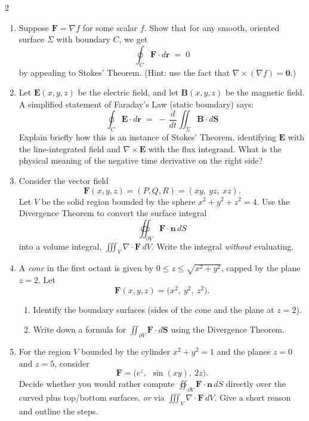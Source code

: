 \begin{multicols}{2}
\begin{enumerate}
\item \enspace
Suppose \(\mathbf{F} = \nabla f\) for some scalar \(f\). Show that for any smooth, oriented surface \(\Sigma\) with boundary \(C\), we get
\[
\oint_C \mathbf{F}\cdot d\mathbf{r} \;=\; 0
\]
by appealing to Stokes' Theorem. (Hint: use the fact that \(\nabla\times(\nabla f)=\mathbf{0}\).)

\item \enspace
Let \(\mathbf{E}(x,y,z)\) be the electric field, and let \(\mathbf{B}(x,y,z)\) be the magnetic field. A simplified statement of Faraday’s Law (static boundary) says:
\[
\oint_C \mathbf{E}\cdot d\mathbf{r}
\;=\;
-\,\frac{d}{dt}
\iint_\Sigma \mathbf{B}\cdot d\mathbf{S}
\]
Explain briefly how this is an instance of Stokes’ Theorem, identifying \(\mathbf{E}\) with the line-integrated field and \(\nabla\times\mathbf{E}\) with the flux integrand. What is the physical meaning of the negative time derivative on the right side?

\item \enspace
Consider the vector field
\[
\mathbf{F}(x,y,z) = (P,Q,R) = (xy,\ yz,\ xz).
\]
Let \(V\) be the solid region bounded by the sphere \(x^2 + y^2 + z^2 = 4\). Use the Divergence Theorem to convert the surface integral
\[
\oiint_{\partial V} \mathbf{F}\cdot \mathbf{n}\,dS
\]
into a volume integral, \(\iiint_V \nabla\cdot\mathbf{F}\,dV\). Write the integral \emph{without} evaluating.

\item \enspace
A \emph{cone} in the first octant is given by \(0\le z\le \sqrt{x^2+y^2}\), capped by the plane \(z=2\). Let
\[
\mathbf{F}(x,y,z) = \bigl(x^2,\ y^2,\ z^2\bigr).
\]
\begin{enumerate}
\item Identify the boundary surfaces (sides of the cone and the plane at \(z=2\)).
\item Write down a formula for \(\iint_{\partial V}\mathbf{F}\cdot d\mathbf{S}\) using the Divergence Theorem.
\end{enumerate}

\item \enspace
For the region \(V\) bounded by the cylinder \(x^2+y^2=1\) and the planes \(z=0\) and \(z=5\), consider
\[
\mathbf{F} = \bigl( e^z,\ \, \sin(xy),\ 2z \bigr).
\]
Decide whether you would rather compute
\(\displaystyle \oiint_{\partial V}\mathbf{F}\cdot \mathbf{n}\,dS\)
directly over the curved plus top/bottom surfaces, \emph{or} via
\(\displaystyle \iiint_V \nabla\cdot \mathbf{F}\,dV\).
Give a short reason and outline the steps.


\end{enumerate}
\end{multicols}
